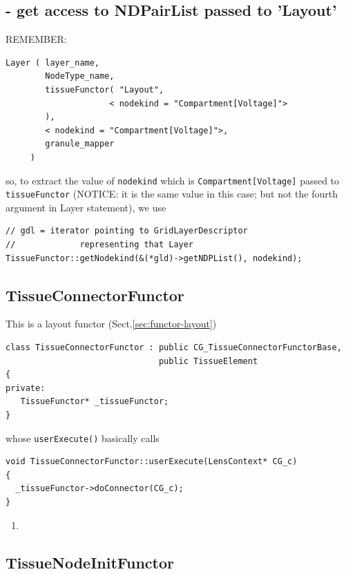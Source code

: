 \subsection{- get access to NDPairList passed to 'Layout'}

REMEMBER:
\begin{verbatim}
Layer ( layer_name,
        NodeType_name,
        tissueFunctor( "Layout", 
                     < nodekind = "Compartment[Voltage]">
        ),
        < nodekind = "Compartment[Voltage]">,
        granule_mapper
     )
\end{verbatim}

so, to extract the value of \verb!nodekind! which is \verb!Compartment[Voltage]!
passed to \verb!tissueFunctor! (NOTICE: it is the same value in this case; but
not the fourth argument in Layer statement), we use
\begin{verbatim}
// gdl = iterator pointing to GridLayerDescriptor 
//             representing that Layer
TissueFunctor::getNodekind(&(*gld)->getNDPList(), nodekind);
\end{verbatim}



\subsection{TissueConnectorFunctor}
\label{sec:TissueConnectorFunctor}
\label{sec:TissueFunctor-connect}

This is a layout functor (Sect.\ref{sec:functor-layout})
\begin{lstlisting}
class TissueConnectorFunctor : public CG_TissueConnectorFunctorBase, 
                               public TissueElement 
{
private:
   TissueFunctor* _tissueFunctor;
}
\end{lstlisting}

whose \verb!userExecute()! basically calls
\begin{verbatim}
void TissueConnectorFunctor::userExecute(LensContext* CG_c) 
{
  _tissueFunctor->doConnector(CG_c);
}
\end{verbatim}


\begin{enumerate}
  \item 
\end{enumerate}

\subsection{TissueNodeInitFunctor}
\label{sec:TissueFunctor-NodeInit}
\label{sec:TissueNodeInitFunctor}

